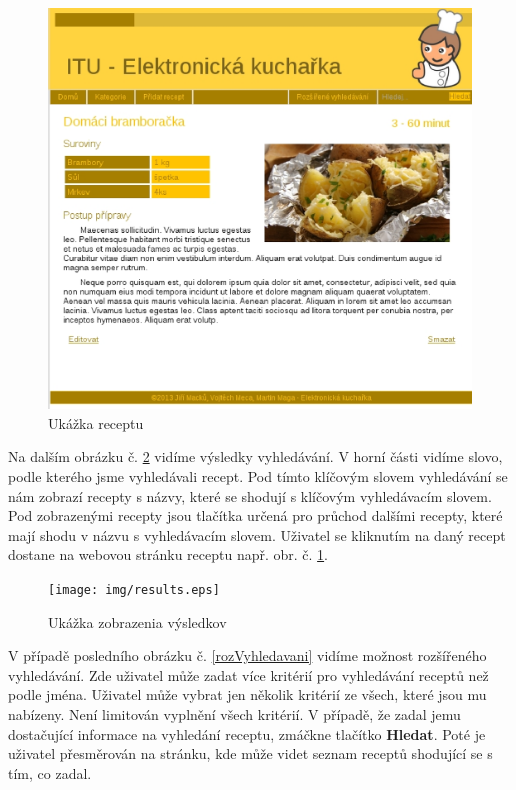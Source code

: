 \documentclass[12pt,a4paper,titlepage,final]{article}
\begin{document}
\begin{figure}

\begin{center}

\includegraphics[scale=0.6]{img/recept.eps} 
\caption{Ukážka receptu}
\label{recept}


\end{center}

\end{figure}
\newpage
Na dalším obrázku č. \ref{vysledky} vidíme výsledky vyhledávání. V horní části vidíme slovo, podle kterého jsme vyhledávali recept. Pod tímto klíčovým slovem vyhledávání se nám zobrazí recepty s názvy, které se shodují s klíčovým vyhledávacím slovem. Pod zobrazenými recepty jsou tlačítka určená pro průchod dalšími recepty, které mají shodu v názvu s vyhledávacím slovem. Uživatel se kliknutím na daný recept dostane na webovou stránku receptu např. obr. č. \ref{recept}.\newline

\begin{figure}

\begin{center}

\texttt{[image: img/results.eps]} 
\caption{Ukážka zobrazenia výsledkov}
\label{vysledky}

\end{center}

\end{figure}
\newpage
V případě posledního obrázku č. \ref{rozVyhledavani} vidíme možnost rozšířeného vyhledávání. Zde uživatel může zadat více kritérií pro vyhledávání receptů než podle jména. Uživatel může vybrat jen několik kritérií ze všech, které jsou mu nabízeny. Není limitován vyplnění všech kritérií. V případě, že zadal jemu dostačující informace na vyhledání receptu, zmáčkne tlačítko \textbf{Hledat}. Poté je uživatel přesměrován na stránku, kde může videt seznam receptů shodující se s tím, co zadal.  
\end{document}
